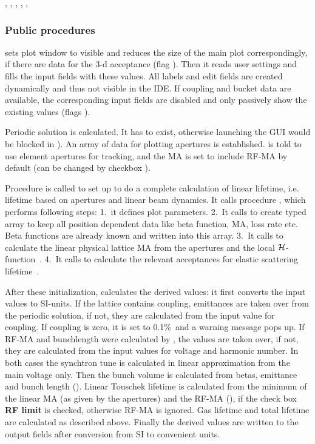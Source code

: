 \documentclass[12pt]{article}
\newcommand\code[1]{{\tt #1}}
\newcommand{\ofld}[1]{\colorbox{black!15}{{{\color{black}\bf #1}}}}
\newcommand\guico[1]{{\color{blue}\code{#1}}}
\newcommand{\unico}[1]{{\color{burntorange}\code{#1}}}
\newcommand{\opagui}[1]{\colorbox{blue!20}{{\color{black}\code{#1}}}}
\newcommand{\ogui}[1]{\hyperref[#1]{\opagui{#1}}}
\newcommand{\opaguif}[1]{\colorbox{violet!30}{{\color{black}\code{#1}}}}
\newcommand{\oguif}[1]{\hyperref[#1]{\opaguif{#1}}}
\newcommand{\opauni}[1]{\colorbox{orange!30}{{\color{black}\code{#1}}}}
\newcommand{\ouni}[1]{\hyperref[#1]{\opauni{#1}}}
\newcommand{\uses}[1]{\flushleft {\bf Uses:} #1}
\newcommand{\ppro}[1]{\subsubsection*{Public procedures} #1}
\begin{document}
\uses{\ouni{tracklib}, \ouni{linoplib}, \ouni{globlib} \ouni{mathlib}, \oguif{comfigureframe}, \ouni{comvgraphlib}, \ouni{comauxlib}}

\ppro{
\guico{Start} sets plot window \guico{flofig} to visible and reduces the size of the main plot \guico{fig} correspondingly, if there are data for the 3-d acceptance (flag \unico{status.FloPoly}). Then it reads user settings and fills the input fields with these values. 
All labels and edit fields are created dynamically and thus not visible in the IDE. If coupling and bucket data are available, the corresponding input fields are disabled and only passively show the existing values (flags \unico{status.uncoupled, .rfaccept}). 

Periodic solution is calculated. It has to exist, otherwise launching the GUI would be blocked in \ogui{opamenu}). An array of data for plotting apertures is established. \ouni{tracklib} is told to use element apertures for tracking, and the MA is set to include RF-MA by default (can be changed by checkbox \guico{chkRFL}). 

Procedure \guico{Output} is called to set up to do a complete calculation of linear lifetime, i.e. lifetime based on apertures and linear beam dynamics. It calls procedure \guico{CalcBeta}, which performs following steps: 1.~it defines plot parameters. 2.~It calls \guico{InitSigma} to create typed array \guico{tsig} to keep all position dependent data like beta function, MA, loss rate etc. Beta functions are already known and written into this array. 3.~It calls \guico{CalcMAlin} to calculate the linear physical lattice MA from the apertures and the local $\cal H$-function~\cite{inside}. 4.~It calls \guico{CalcAccEL} to calculate the relevant acceptances for elastic scattering lifetime~\cite{inside}.

After these initialization, \guico{Output} calculates the derived values: it first converts the input values to SI-units. If the lattice contains coupling, emittances are taken over from the periodic solution, if not, they are calculated from the input value for coupling. If coupling is zero, it is set to 0.1\%\ and a warning message pops up. If RF-MA and bunchlength were calculated by \ogui{opabucket}, the values are taken over, if not, they are calculated from the input values for voltage and harmonic number. In both cases the synchtron tune is calculated in linear approximation from the main voltage only. Then the bunch volume is calculated from betas, emittance and bunch length (\guico{CalcSigma}). Linear Touschek lifetime is calculated from the minimum of the linear MA (as given by the apertures) and the RF-MA (\guico{CalcLifetime}), if the check box \ofld{RF limit} is checked, otherwise RF-MA is ignored. Gas lifetime and total lifetime are calculated as described above. Finally the derived values are written to the output fields after conversion from SI to convenient units.
}
\end{document}
